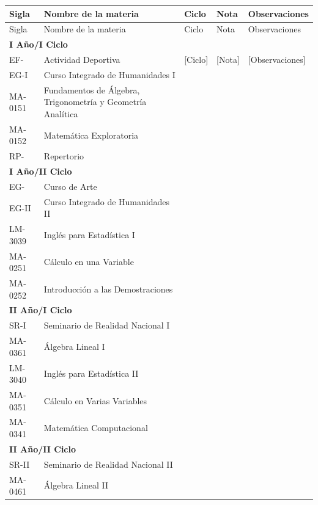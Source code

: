 \begin{longtable}{|p{2cm}|p{7cm}|p{1.6cm}|p{1.6cm}|p{2.8cm}|}
\hline
\rowcolor[HTML]{00C0F3}
Sigla & Nombre de la materia & Ciclo & Nota & Observaciones \\ \hline
\endfirsthead
\hline
\rowcolor[HTML]{00C0F3}
Sigla & Nombre de la materia & Ciclo & Nota & Observaciones \\ \hline
\endhead
\multicolumn{5}{|l|}{\cellcolor[HTML]{E6E6E6}\textbf{I Año/I Ciclo}} \\ \hline
EF- & Actividad Deportiva & [Ciclo] & [Nota] & [Observaciones] \\ \hline
EG-I & Curso Integrado de Humanidades I &  &  &  \\ \hline
MA-0151 & Fundamentos de Álgebra, Trigonometría y Geometría Analítica &  &  &  \\ \hline
MA-0152 & Matemática Exploratoria &  &  &  \\ \hline
RP- & Repertorio &  &  &  \\ \hline
\multicolumn{5}{|l|}{\cellcolor[HTML]{E6E6E6}\textbf{I Año/II Ciclo}} \\ \hline
EG- & Curso de Arte &  &  &  \\ \hline
EG-II & Curso Integrado de Humanidades II &  &  &  \\ \hline
LM-3039 & Inglés para Estadística I &  &  &  \\ \hline
MA-0251 & Cálculo en una Variable &  &  &  \\ \hline
MA-0252 & Introducción a las Demostraciones &  &  &  \\ \hline
\multicolumn{5}{|l|}{\cellcolor[HTML]{E6E6E6}\textbf{II Año/I Ciclo}} \\ \hline
SR-I & Seminario de Realidad Nacional I &  &  &  \\ \hline
MA-0361 & Álgebra Lineal I &  &  &  \\ \hline
LM-3040 & Inglés para Estadística II &  &  &  \\ \hline
MA-0351 & Cálculo en Varias Variables &  &  &  \\ \hline
MA-0341 & Matemática Computacional &  &  &  \\ \hline
\multicolumn{5}{|l|}{\cellcolor[HTML]{E6E6E6}\textbf{II Año/II Ciclo}} \\ \hline
SR-II & Seminario de Realidad Nacional II &  &  &  \\ \hline
MA-0461 & Álgebra Lineal II &  &  &  \\ \hline

\end{longtable}
